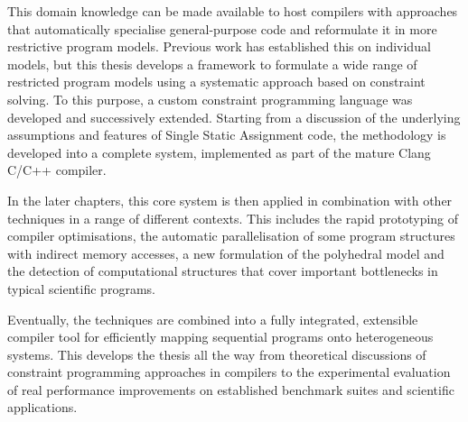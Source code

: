     This domain knowledge can be made available to host compilers with
    approaches that automatically specialise general-purpose code and
    reformulate it in more restrictive program models.
    Previous work has established this on individual models, but this thesis
    develops a framework to formulate a wide range of restricted program models
    using a systematic approach based on constraint solving.
    To this purpose, a custom constraint programming language was developed
    and successively extended.
    Starting from a discussion of the underlying assumptions and features of
    Single Static Assignment code, the methodology is developed into a complete
    system, implemented as part of the mature Clang C/C++ compiler.

    In the later chapters, this core system is then applied in combination
    with other techniques in a range of different contexts.
    This includes the rapid prototyping of compiler optimisations, the
    automatic parallelisation of some program structures with indirect memory
    accesses, a new formulation of the polyhedral model and the detection of
    computational structures that cover important bottlenecks in typical
    scientific programs.

    Eventually, the techniques are combined into a fully integrated, extensible
    compiler tool for efficiently mapping sequential programs onto heterogeneous
    systems.
    This develops the thesis all the way from theoretical discussions of
    constraint programming approaches in compilers to the experimental
    evaluation of real performance improvements on established benchmark suites
    and scientific applications.
    \vfill






